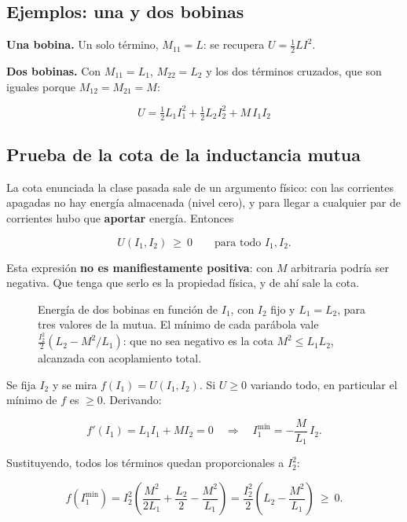 \documentclass[12pt,a4paper]{article}
\begin{document}
\subsection{Ejemplos: una y dos bobinas}

\textbf{Una bobina.} Un solo término, $M_{11} = L$: se recupera $U = \tfrac12 L I^2$.

\textbf{Dos bobinas.} Con $M_{11} = L_1$, $M_{22} = L_2$ y los dos términos cruzados,
que son iguales porque $M_{12} = M_{21} = M$:

\begin{keybox}
\[
\boxed{\ U = \tfrac12 L_1 I_1^2 + \tfrac12 L_2 I_2^2 + M\,I_1 I_2\ }
\]
\end{keybox}

\subsection{Prueba de la cota de la inductancia mutua}

La cota enunciada la clase pasada sale de un argumento físico: con las
corrientes apagadas no hay energía almacenada (nivel cero), y para llegar a
cualquier par de corrientes hubo que \textbf{aportar} energía. Entonces

\[
U(I_1, I_2)\ \ge\ 0 \qquad\text{para todo } I_1, I_2 .
\]

\begin{notebox}
Esta expresión \textbf{no es manifiestamente positiva}: con $M$ arbitraria podría
ser negativa. Que tenga que serlo es la propiedad física, y de ahí sale la
cota.
\end{notebox}

\begin{figure}[H]
  \centering
  
  \caption{Energía de dos bobinas en función de $I_1$, con $I_2$ fijo y $L_1 = L_2$, para tres valores de la mutua. El mínimo de cada parábola vale $\tfrac{I_2^2}{2}(L_2 - M^2/L_1)$: que no sea negativo es la cota $M^2\le L_1L_2$, alcanzada con acoplamiento total.}
\end{figure}

Se fija $I_2$ y se mira $f(I_1) = U(I_1, I_2)$. Si $U\ge0$ variando todo, en
particular el mínimo de $f$ es $\ge0$. Derivando:

\[
f'(I_1) = L_1 I_1 + M I_2 = 0
\quad\Longrightarrow\quad
I_1^{\min} = -\frac{M}{L_1}\,I_2 .
\]

Sustituyendo, todos los términos quedan proporcionales a $I_2^2$:

\[
f(I_1^{\min}) = I_2^2\left(\frac{M^2}{2L_1} + \frac{L_2}{2} - \frac{M^2}{L_1}\right)
= \frac{I_2^2}{2}\left(L_2 - \frac{M^2}{L_1}\right)\ \ge\ 0 .
\]
\end{document}
